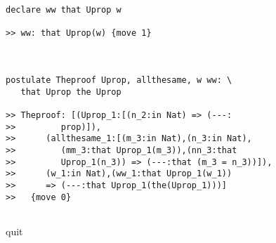 \begin{verbatim}
declare ww that Uprop w

>> ww: that Uprop(w) {move 1}



postulate Theproof Uprop, allthesame, w ww: \
   that Uprop the Uprop

>> Theproof: [(Uprop_1:[(n_2:in Nat) => (---:
>>         prop)]),
>>      (allthesame_1:[(m_3:in Nat),(n_3:in Nat),
>>         (mm_3:that Uprop_1(m_3)),(nn_3:that
>>         Uprop_1(n_3)) => (---:that (m_3 = n_3))]),
>>      (w_1:in Nat),(ww_1:that Uprop_1(w_1))
>>      => (---:that Uprop_1(the(Uprop_1)))]
>>   {move 0}


\end{verbatim}





quit
